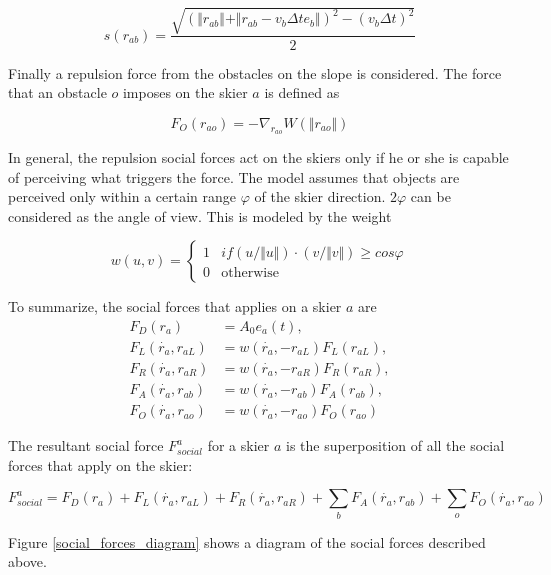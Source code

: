 \documentclass[12pt,a4paper,twoside]{book}
\begin{document}
\begin{equation}\label{skier_s}
s(r_{ab})=\frac{\sqrt{(\Vert r_{ab} \Vert + \Vert r_{ab}-v_b \Delta t e_b \Vert )^2-(v_b \Delta t)^2}}{2}
\end{equation}

Finally a repulsion force from the obstacles on the slope is considered. The force that an obstacle $o$ imposes on the skier $a$ is defined as

\begin{equation}\label{obstacle_force}
F_O(r_{ao})=-\nabla_{r_{ao}}W(\Vert r_{ao} \Vert )
\end{equation}

In general, the repulsion social forces act on the skiers only if he or she is capable of perceiving what triggers the force. The model assumes that objects are perceived only within a certain range $\varphi$ of the skier direction. $2\varphi$ can be considered as the angle of view. This is modeled by the weight

\begin{equation}\label{visibility}
w(u,v)=\begin{cases}
  1 & \text{$if(u/\Vert u \Vert)\cdot (v/\Vert v \Vert) \geq cos \varphi$} \\
  0 & \text{otherwise }
  \end{cases}
\end{equation}

To summarize, the social forces that applies on a skier $a$ are
\begin{align}\label{social_forces_tb}
F_D(r_a)&=A_0 e_a(t),\\
F_L(\dot{r_a},r_{aL})&=w(\dot{r_a},-r_{aL})F_L(r_{aL}),\\
F_R(\dot{r_a},r_{aR})&=w(\dot{r_a},-r_{aR})F_R(r_{aR}),\\
F_A(\dot{r_a},r_{ab})&=w(\dot{r_a},-r_{ab})F_A(r_{ab}),\\
F_O(\dot{r_a},r_{ao})&=w(\dot{r_a},-r_{ao})F_O(r_{ao})
\end{align}

The resultant social force $F^a_{social}$ for a skier $a$ is the superposition of all the social forces that apply on the skier:

\begin{equation}
F^a_{social}=F_D(r_a)+F_L(\dot{r_a},r_{aL})+F_R(\dot{r_a},r_{aR})+\sum_b F_A(\dot{r_a},r_{ab})+\sum_o F_O(\dot{r_a},r_{ao})\nonumber
\end{equation}

Figure \ref{social_forces_diagram} shows a diagram of the social forces described above.
\end{document}
